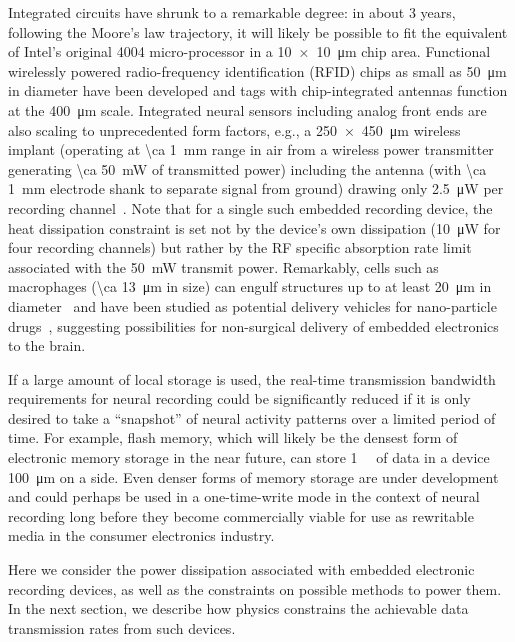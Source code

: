 Integrated circuits have shrunk to a remarkable degree: in about 3 years, following the Moore's law trajectory, it will likely be possible to fit the equivalent of Intel's original 4004 micro-processor in a \SI{10 x 10}{\micro\meter} chip area.
Functional wirelessly powered radio-frequency identification (RFID) chips as small as \SI{50}{\micro\meter} in diameter have been developed and tags with chip-integrated antennas function at the \SI{400}{\micro\meter} scale.
Integrated neural sensors including analog front ends are also scaling to unprecedented form factors, e.g., a \SI{250 x 450}{\micro\meter} wireless implant (operating at \SI{\ca 1}{\milli\meter} range in air from a wireless power transmitter generating \SI{\ca 50}{\milli\watt} of transmitted power) including the antenna (with \SI{\ca 1}{\milli\meter} electrode shank to separate signal from ground) drawing only \SI{2.5}{\micro\watt} per recording channel~\cite{biederman13}.
Note that for a single such embedded recording device, the heat dissipation constraint is set not by the device's own dissipation (\SI{10}{\micro\watt} for four recording channels) but rather by the RF specific absorption rate limit associated with the \SI{50}{\milli\watt} transmit power.
Remarkably, cells such as macrophages (\SI{\ca 13}{\micro\meter} in size) can engulf structures up to at least \SI{20}{\micro\meter} in diameter~\cite{cannon92} and have been studied as potential delivery vehicles for nano-particle drugs~\cite{Kadiu11}, suggesting possibilities for non-surgical delivery of embedded electronics to the brain.

If a large amount of local storage is used, the real-time transmission bandwidth requirements for neural recording could be significantly reduced if it is only desired to take a ``snapshot'' of neural activity patterns over a limited period of time.
For example, flash memory, which will likely be the densest form of electronic memory storage in the near future, can store \SI{1}{\mega\bit} of data in a device \SI{100}{\micro\meter} on a side.
Even denser forms of memory storage are under development and could perhaps be used in a one-time-write mode in the context of neural recording long before they become commercially viable for use as rewritable media in the consumer electronics industry.

Here we consider the power dissipation associated with embedded electronic recording devices, as well as the constraints on possible methods to power them.
In the next section, we describe how physics constrains the achievable data transmission rates from such devices.

